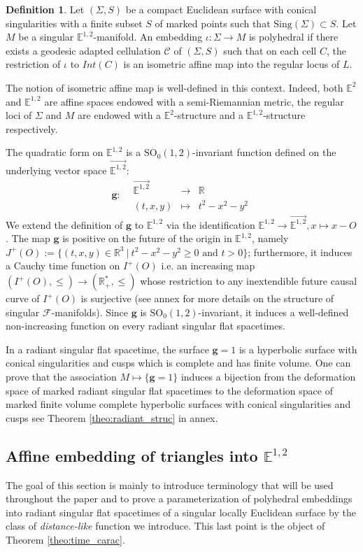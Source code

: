 \documentclass[a4paper,12pt]{article}
\def\E{\mathbf E}
\def\SO{\mathrm{SO}}
\def\E{\mathbb{E}}
\def\sing{\mathrm{Sing}}
\def\RR{\mathbb{R}}
\newcommand{\mass}[1]{{\mathbb E}^{1,2}_{#1}}
\def\SO{\mathrm{SO}}
\def\quadform{\mathbf{g}}
\def\Cell{\mathcal C}
\def\E{\mathbb{E}}
\def\sing{\mathrm{Sing}}
\def\sing{\mathrm{Sing}}
\newcommand{\function}[5]{\displaystyle#1:\begin{array}{l|rcl}
& \displaystyle #2 & \longrightarrow & \displaystyle #3 \\
	& \displaystyle #4 & \longmapsto & \displaystyle #5 \end{array}}
\theoremstyle{definition}
\newtheorem{defi}[lem]{Definition}	%
\begin{document}
					\begin{defi} Let $(\Sigma, S)$ be a compact Euclidean surface with conical singularities with a finite subset $S$ of marked points such that $\sing(\Sigma)\subset S$. Let $M$ be a singular $\mass{}$-manifold.
					An embedding $\iota: \Sigma \rightarrow M$ is polyhedral if there exists a geodesic adapted cellulation $\Cell$ of $(\Sigma, S)$ such that on each cell $C$, the restriction of $\iota$ to 
					 $Int(C)$ is an isometric affine map into the regular locus of $L$.
					\end{defi}
					
					The notion of isometric affine map is well-defined in this context. Indeed, both $\E^2$ and $\mass{}$ are affine spaces endowed with a semi-Riemannian metric, the regular loci of $\Sigma$ and $M$ are endowed with a $\E^2$-structure and a $\mass{}$-structure respectively.

					
					
					The quadratic form on $\mass{}$ is a $\SO_0(1,2)$-invariant function defined on the underlying vector space $\overrightarrow{\mass{}}$: 
			$$\function{\quadform}{\overrightarrow{\mass{}}}{\RR}{(t,x,y)}{t^2-x^2-y^2}$$
		We extend the definition of $\quadform$ to $\mass{}$ via the identification $\mass{}\rightarrow \overrightarrow{\mass{}}, x\mapsto x-O$.
		The map $\quadform$ is positive on the future of the origin in $\mass{}$, namely $J^+(O):= \{(t,x,y)\in \RR^3 ~|~ t^2-x^2-y^2\geq 0 \text{~and~} t>0\}$; furthermore, it induces a Cauchy time function on $I^+(O)$ i.e. an increasing map $(I^+(O),\leq)\rightarrow (\RR_+^*,\leq)$ whose restriction to any inextendible future causal curve of $I^+(O)$ is surjective (see annex for more details on the structure of singular $\mathcal F$-manifolds). 
		Since $\quadform$ is $\SO_0(1,2)$-invariant, it induces a well-defined non-increasing function on every radiant singular flat spacetimes.
				
				
		In a radiant singular flat spacetime, the surface $\quadform = 1$ is a hyperbolic surface with conical singularities and cusps which is complete and has finite volume. One can prove that the association $M \mapsto \{\quadform=1\}$ induces a bijection from the deformation space of marked radiant singular flat spacetimes to the deformation space of marked finite volume complete hyperbolic surfaces with conical singularities and cusps see Theorem \ref{theo:radiant_struc} in annex.
		
		\subsection{Affine embedding of triangles into $\mass{}$}
							The goal of this section is mainly to introduce terminology that will be used throughout the paper and to prove a parameterization of polyhedral embeddings into radiant singular flat spacetimes of a singular locally Euclidean surface by the class  of {\it distance-like} function we introduce. This last point is the object of Theorem \ref{theo:time_carac}.
							
\end{document}
